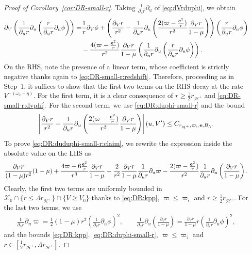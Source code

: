 \documentclass[10pt, reqno]{amsart}
\theoremstyle{definition}
\theoremstyle{remark}
\theoremstyle{conjecture}
\numberwithin{equation}{section}
\newcommand{\set}[1]{\{#1\}}
\newcommand{\rd}{\partial}
\newcommand{\0}{\emptyset}
\newcommand{\kpp}{\kappa}
\newcommand{\Lmb}{\Lambda}
\newcommand{\omg}{\omega}
\newcommand{\bfe}{{\bf e}}
\newcommand{\calH}{\mathcal H}
\newcommand{\calX}{\mathcal X}
\newcommand{\EH}{\calH^{+}}
\newcommand{\e}{\bfe}							%
\newcommand{\Abs}[1]{\left\vert #1 \right\vert}
\begin{document}
\begin{proof}[Proof of Corollary~\ref{cor:DR-small-r}]
Taking $\frac{1}{\rd_{u} r} \rd_{u}$ of \eqref{eq:dVrduphi}, we obtain
\begin{align*}
	\rd_{V} \left(\frac{1}{\rd_{u} r} \rd_{u} \left(\frac{r}{\rd_{u} r} \rd_{u} \phi\right) \right)
=& 	\frac{1}{r} \rd_{V} \phi
	+ \left( \frac{\rd_{V} r}{r^{2}} - \frac{1}{\rd_{u} r} \rd_{u} \left(\frac{2 (\varpi - \frac{\e^{2}}{r})}{r^{2}} \frac{\rd_{V} r}{1-\mu} \right) \right) 
		\left( \frac{r}{\rd_{u} r} \rd_{u} \phi \right) \\
	& - \frac{4 (\varpi - \frac{\e^{2}}{r})}{r^{2}} \frac{\rd_{V} r}{1-\mu} \left(\frac{1}{\rd_{u} r} \rd_{u} \left(\frac{r}{\rd_{u} r} \rd_{u} \phi\right) \right) .
\end{align*}
On the RHS, note the presence of a linear term, whose coefficient is strictly negative thanks again to \eqref{eq:DR-small-r:redshift}. Therefore, proceeding as in Step~1, it suffices to show that the first two terms on the RHS decay at the rate $V^{-(\omg_{0}-\eta)}$. For the first term, it is a clear consequence of $r \geq \frac{1}{2} r_{\EH}$ and \eqref{eq:DR-small-r:dvphi}. For the second term, we use \eqref{eq:DR:duphi-small-r} and the bound
\begin{equation} \label{eq:DR:duduphi-small-r:claim}
\Abs{ \frac{\rd_{V} r}{r^{2}} - \frac{1}{\rd_{u} r} \rd_{u} \left(\frac{2 (\varpi - \frac{\e^{2}}{r})}{r^{2}} \frac{\rd_{V} r}{1-\mu} \right) } (u, V') \leq C_{r_{\EH}, \varpi_{i}, \e, B_{\Lmb}} .
\end{equation}
To prove \eqref{eq:DR:duduphi-small-r:claim}, we rewrite the expression inside the absolute value on the LHS as
\begin{align*}
\frac{\rd_{V} r}{(1-\mu) r^{2}} (1-\mu)  
+ \frac{4 \varpi - 6 \frac{\e^{2}}{r}}{r^{3}} \frac{\rd_{V} r}{1-\mu} - \frac{2}{r^{2}} \frac{\rd_{V} r}{1-\mu} \frac{1}{\rd_{u} r} \rd_{u} \varpi 
- \frac{2 (\varpi - \frac{\e^{2}}{r})}{r^{2}} \frac{1}{\rd_{u} r} \rd_{u} \left( \frac{\rd_{V} r}{1-\mu} \right).
\end{align*}
Clearly, the first two terms are uniformly bounded in $\calX_{0} \cap \set{r \leq \Lmb r_{\EH}} \cap \set{V \geq V_{0}}$ thanks to \eqref{eq:DR:kpp}, $\varpi \leq \varpi_{i}$ and $r \geq \frac{1}{2} r_{\EH}$. For the last two terms, we use
\begin{align*}
\frac{1}{\rd_{u} r} \rd_{u} \varpi
= \frac{1}{2} (1-\mu) r^{2} \left( \frac{1}{\rd_{u} r} \rd_{u} \phi \right)^{2}, \qquad
\frac{1}{\rd_{u} r} \rd_{u} \left( \frac{\rd_{V} r}{1-\mu} \right)
=  \frac{\rd_{V} r}{1-\mu} r \left( \frac{1}{\rd_{u} r} \rd_{u} \phi \right)^{2}, 
\end{align*}
and the bounds \eqref{eq:DR:kpp}, \eqref{eq:DR:duphi-small-r}, $\varpi \leq \varpi_{i}$ and $r \in [\frac{1}{2} r_{\EH}, \Lambda r_{\EH}]$.


\end{proof}
\end{document}
